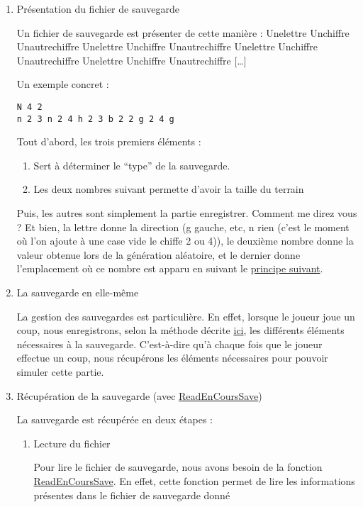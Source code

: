 \documentclass[letter]{article}
\begin{document}
\begin{enumerate}
\item Présentation du fichier de sauvegarde
\label{sec:org526f538}




Un fichier de sauvegarde est présenter de cette manière :
Unelettre Unchiffre Unautrechiffre
Unelettre Unchiffre Unautrechiffre Unelettre Unchiffre Unautrechiffre Unelettre Unchiffre Unautrechiffre [\ldots{}]

Un exemple concret :
\begin{verbatim}
N 4 2
n 2 3 n 2 4 h 2 3 b 2 2 g 2 4 g 
\end{verbatim}

Tout d'abord, les trois premiers éléments :
\begin{enumerate}
\item Sert à déterminer le “type” de la sauvegarde.
\item Les deux nombres suivant permette d'avoir la taille du terrain
\end{enumerate}

Puis, les autres sont simplement la partie enregistrer.
Comment me direz vous ?
Et bien, la lettre donne la direction (g gauche, etc, n rien (c'est le moment où l'on ajoute à une case vide le chiffe 2 ou 4)), le deuxième nombre donne la valeur obtenue lors de la génération aléatoire, et le dernier donne l'emplacement où ce nombre est apparu en suivant le \hyperref[sec:org9f990e6]{principe suivant}.


\item La sauvegarde en elle-même
\label{sec:orga34f6bc}

La gestion des sauvegardes est particulière.
En effet, lorsque le joueur joue un coup, nous enregistrons, selon la méthode décrite \hyperref[sec:org526f538]{ici}, les différents éléments nécessaires à la sauvegarde.
C'est-à-dire qu'à chaque fois que le joueur effectue un coup, nous récupérons les éléments nécessaires pour pouvoir simuler cette partie.

\item Récupération de la sauvegarde (avec \hyperref[sec:orge8f4271]{ReadEnCoursSave})
\label{sec:org9f990e6}

La sauvegarde est récupérée en deux étapes :

\begin{enumerate}
\item Lecture du fichier
\label{sec:orgbe94e85}

Pour lire le fichier de sauvegarde, nous avons besoin de la fonction \hyperref[sec:orge8f4271]{ReadEnCoursSave}. En effet, cette fonction permet de lire les informations présentes dans le fichier de sauvegarde donné


\end{enumerate}
\end{enumerate}
\end{document}
